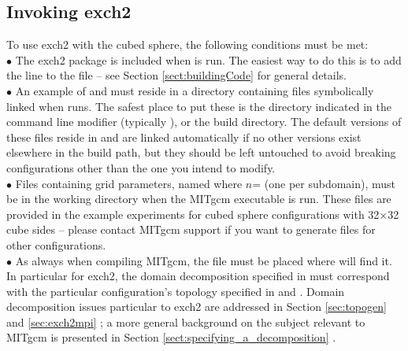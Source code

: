 \subsection{Invoking exch2}

To use exch2 with the cubed sphere, the following conditions must be
met: \\

$\bullet$ The exch2 package is included when  is run.
  The easiest way to do this is to add the line  to the
   file -- see Section
  \ref{sect:buildingCode}  for general
  details. \\

$\bullet$ An example of  and
   must reside in a directory containing files
  symbolically linked when  runs.  The safest place to
  put these is the directory indicated in the  command
  line modifier (typically ), or the build directory.
  The default versions of these files reside in  and
  are linked automatically if no other versions exist elsewhere in the
  build path, but they should be left untouched to avoid breaking
  configurations other than the one you intend to modify.\\

$\bullet$ Files containing grid parameters, named
   where $n$= (one per subdomain),
  must be in the working directory when the MITgcm executable is run.
  These files are provided in the example experiments for cubed sphere
  configurations with 32$\times$32 cube sides 
  -- please contact MITgcm support if you want to generate
  files for other configurations. \\

$\bullet$ As always when compiling MITgcm, the file  must
  be placed where  will find it.  In particular for
  exch2, the domain decomposition specified in  must
  correspond with the particular configuration's topology specified in
   and .  Domain
  decomposition issues particular to exch2 are addressed in Section
  \ref{sec:topogen} 
  and \ref{sec:exch2mpi} ; a more
  general background on the subject relevant to MITgcm is presented in
  Section \ref{sect:specifying_a_decomposition}
  .\\

